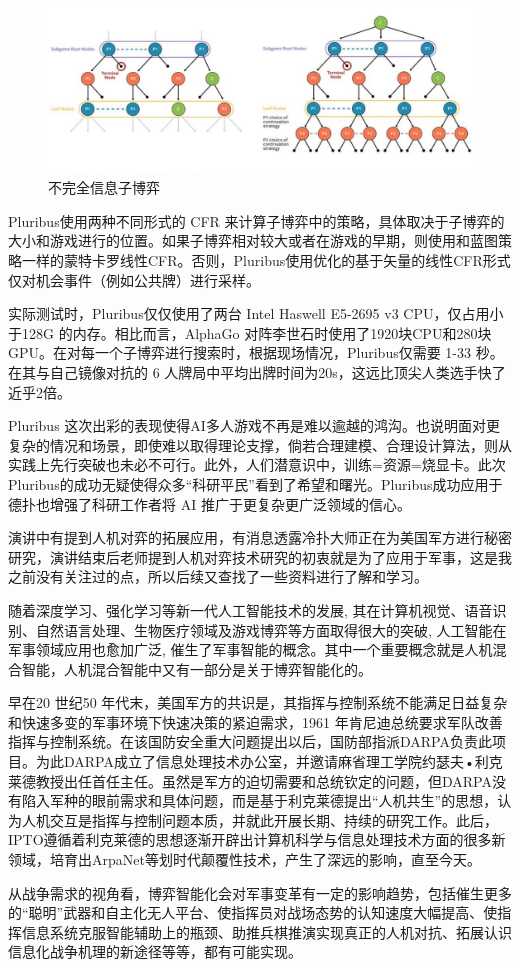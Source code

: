 \documentclass{article}
\begin{document}
\begin{figure}[h!]
	\centering
	\includegraphics[scale=0.6]{d}
	\caption{不完全信息子博弈}
	\label{fig:universe}
\end{figure}
Pluribus使用两种不同形式的 CFR 来计算子博弈中的策略，具体取决于子博弈的大小和游戏进行的位置。如果子博弈相对较大或者在游戏的早期，则使用和蓝图策略一样的蒙特卡罗线性CFR。否则，Pluribus使用优化的基于矢量的线性CFR形式仅对机会事件（例如公共牌）进行采样。\par
实际测试时，Pluribus仅仅使用了两台 Intel Haswell E5-2695 v3 CPU，仅占用小于128G 的内存。相比而言，AlphaGo 对阵李世石时使用了1920块CPU和280块GPU。在对每一个子博弈进行搜索时，根据现场情况，Pluribus仅需要 1-33 秒。在其与自己镜像对抗的 6 人牌局中平均出牌时间为20s，这远比顶尖人类选手快了近乎2倍。\par
Pluribus 这次出彩的表现使得AI多人游戏不再是难以逾越的鸿沟。也说明面对更复杂的情况和场景，即使难以取得理论支撑，倘若合理建模、合理设计算法，则从实践上先行突破也未必不可行。此外，人们潜意识中，训练=资源=烧显卡。此次Pluribus的成功无疑使得众多“科研平民”看到了希望和曙光。Pluribus成功应用于德扑也增强了科研工作者将 AI 推广于更复杂更广泛领域的信心。\par
演讲中有提到人机对弈的拓展应用，有消息透露冷扑大师正在为美国军方进行秘密研究，演讲结束后老师提到人机对弈技术研究的初衷就是为了应用于军事，这是我之前没有关注过的点，所以后续又查找了一些资料进行了解和学习。\par
随着深度学习、强化学习等新一代人工智能技术的发展, 其在计算机视觉、语音识别、自然语言处理、生物医疗领域及游戏博弈等方面取得很大的突破, 人工智能在军事领域应用也愈加广泛, 催生了军事智能的概念\citep{hh}。其中一个重要概念就是人机混合智能，人机混合智能中又有一部分是关于博弈智能化的。\par
早在20 世纪50 年代末，美国军方的共识是，其指挥与控制系统不能满足日益复杂和快速多变的军事环境下快速决策的紧迫需求，1961 年肯尼迪总统要求军队改善指挥与控制系统。在该国防安全重大问题提出以后，国防部指派DARPA负责此项目。为此DARPA成立了信息处理技术办公室，并邀请麻省理工学院约瑟夫•利克莱德教授出任首任主任。虽然是军方的迫切需要和总统钦定的问题，但DARPA没有陷入军种的眼前需求和具体问题，而是基于利克莱德提出“人机共生”的思想，认为人机交互是指挥与控制问题本质，并就此开展长期、持续的研究工作。此后，IPTO遵循着利克莱德的思想逐渐开辟出计算机科学与信息处理技术方面的很多新领域，培育出ArpaNet等划时代颠覆性技术，产生了深远的影响，直至今天。\par
从战争需求的视角看，博弈智能化会对军事变革有一定的影响趋势，包括催生更多的“聪明”武器和自主化无人平台、使指挥员对战场态势的认知速度大幅提高、使指挥信息系统克服智能辅助上的瓶颈、助推兵棋推演实现真正的人机对抗、拓展认识信息化战争机理的新途径等等，都有可能实现。\par
\end{document}
